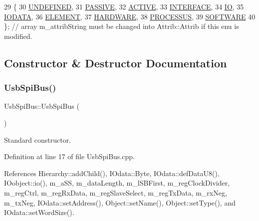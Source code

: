 \begin{DoxyCode}
29                 \{
30     \hyperlink{classAttrib_a69e171d7cc6417835a5a306d3c764235a3a8da2ab97dda18aebab196fe4100531}{UNDEFINED},
31     \hyperlink{classAttrib_a69e171d7cc6417835a5a306d3c764235a2bfb2af57b87031d190a05fe25dd92ed}{PASSIVE},
32     \hyperlink{classAttrib_a69e171d7cc6417835a5a306d3c764235a3b1fec929c0370d1436f2f06e298fb0d}{ACTIVE},
33     \hyperlink{classAttrib_a69e171d7cc6417835a5a306d3c764235aa27c16b480a369ea4d18b07b2516bbc7}{INTERFACE},
34     \hyperlink{classAttrib_a69e171d7cc6417835a5a306d3c764235a1420a5b8c0540b2af210b6975eded7f9}{IO},
35     \hyperlink{classAttrib_a69e171d7cc6417835a5a306d3c764235a0af3b0d0ac323c1704e6c69cf90add28}{IODATA},
36     \hyperlink{classAttrib_a69e171d7cc6417835a5a306d3c764235a7788bc5dd333fd8ce18562b269c9dab1}{ELEMENT},
37     \hyperlink{classAttrib_a69e171d7cc6417835a5a306d3c764235a61ceb22149f365f1780d18f9d1459423}{HARDWARE},
38     \hyperlink{classAttrib_a69e171d7cc6417835a5a306d3c764235a75250e29692496e73effca2c0330977f}{PROCESSUS},
39     \hyperlink{classAttrib_a69e171d7cc6417835a5a306d3c764235a103a67cd0b8f07ef478fa45d4356e27b}{SOFTWARE} 
40   \}; \textcolor{comment}{// array m\_attribString must be changed into Attrib::Attrib if this enu is modified. }
\end{DoxyCode}


\subsection{Constructor \& Destructor Documentation}
\mbox{\label{classUsbSpiBus_a75b47c1938d8ee80eb3a32f19765b05e}} 
\subsubsection{\texorpdfstring{Usb\+Spi\+Bus()}{UsbSpiBus()}}
{\footnotesize\ttfamily Usb\+Spi\+Bus\+::\+Usb\+Spi\+Bus (\begin{DoxyParamCaption}{ }\end{DoxyParamCaption})}



Standard constructor. 



Definition at line 17 of file Usb\+Spi\+Bus.\+cpp.



References Hierarchy\+::add\+Child(), I\+Odata\+::\+Byte, I\+Odata\+::def\+Data\+U8(), I\+Oobject\+::io(), m\+\_\+a\+SS, m\+\_\+data\+Length, m\+\_\+l\+S\+B\+First, m\+\_\+reg\+Clock\+Divider, m\+\_\+reg\+Ctrl, m\+\_\+reg\+Rx\+Data, m\+\_\+reg\+Slave\+Select, m\+\_\+reg\+Tx\+Data, m\+\_\+rx\+Neg, m\+\_\+tx\+Neg, I\+Odata\+::set\+Address(), Object\+::set\+Name(), Object\+::set\+Type(), and I\+Odata\+::set\+Word\+Size().


